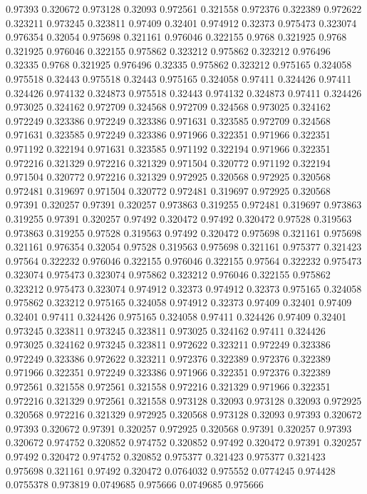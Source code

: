 0.97393 0.320672
0.973128 0.32093
0.972561 0.321558
0.972376 0.322389
0.972622 0.323211
0.973245 0.323811
0.97409 0.32401
0.974912 0.32373
0.975473 0.323074
0.976354 0.32054
0.975698 0.321161
0.976046 0.322155
0.9768 0.321925
0.9768 0.321925
0.976046 0.322155
0.975862 0.323212
0.975862 0.323212
0.976496 0.32335
0.9768 0.321925
0.976496 0.32335
0.975862 0.323212
0.975165 0.324058
0.975518 0.32443
0.975518 0.32443
0.975165 0.324058
0.97411 0.324426
0.97411 0.324426
0.974132 0.324873
0.975518 0.32443
0.974132 0.324873
0.97411 0.324426
0.973025 0.324162
0.972709 0.324568
0.972709 0.324568
0.973025 0.324162
0.972249 0.323386
0.972249 0.323386
0.971631 0.323585
0.972709 0.324568
0.971631 0.323585
0.972249 0.323386
0.971966 0.322351
0.971966 0.322351
0.971192 0.322194
0.971631 0.323585
0.971192 0.322194
0.971966 0.322351
0.972216 0.321329
0.972216 0.321329
0.971504 0.320772
0.971192 0.322194
0.971504 0.320772
0.972216 0.321329
0.972925 0.320568
0.972925 0.320568
0.972481 0.319697
0.971504 0.320772
0.972481 0.319697
0.972925 0.320568
0.97391 0.320257
0.97391 0.320257
0.973863 0.319255
0.972481 0.319697
0.973863 0.319255
0.97391 0.320257
0.97492 0.320472
0.97492 0.320472
0.97528 0.319563
0.973863 0.319255
0.97528 0.319563
0.97492 0.320472
0.975698 0.321161
0.975698 0.321161
0.976354 0.32054
0.97528 0.319563
0.975698 0.321161
0.975377 0.321423
0.97564 0.322232
0.976046 0.322155
0.976046 0.322155
0.97564 0.322232
0.975473 0.323074
0.975473 0.323074
0.975862 0.323212
0.976046 0.322155
0.975862 0.323212
0.975473 0.323074
0.974912 0.32373
0.974912 0.32373
0.975165 0.324058
0.975862 0.323212
0.975165 0.324058
0.974912 0.32373
0.97409 0.32401
0.97409 0.32401
0.97411 0.324426
0.975165 0.324058
0.97411 0.324426
0.97409 0.32401
0.973245 0.323811
0.973245 0.323811
0.973025 0.324162
0.97411 0.324426
0.973025 0.324162
0.973245 0.323811
0.972622 0.323211
0.972249 0.323386
0.972249 0.323386
0.972622 0.323211
0.972376 0.322389
0.972376 0.322389
0.971966 0.322351
0.972249 0.323386
0.971966 0.322351
0.972376 0.322389
0.972561 0.321558
0.972561 0.321558
0.972216 0.321329
0.971966 0.322351
0.972216 0.321329
0.972561 0.321558
0.973128 0.32093
0.973128 0.32093
0.972925 0.320568
0.972216 0.321329
0.972925 0.320568
0.973128 0.32093
0.97393 0.320672
0.97393 0.320672
0.97391 0.320257
0.972925 0.320568
0.97391 0.320257
0.97393 0.320672
0.974752 0.320852
0.974752 0.320852
0.97492 0.320472
0.97391 0.320257
0.97492 0.320472
0.974752 0.320852
0.975377 0.321423
0.975377 0.321423
0.975698 0.321161
0.97492 0.320472
0.0764032 0.975552
0.0774245 0.974428
0.0755378 0.973819
0.0749685 0.975666
0.0749685 0.975666
